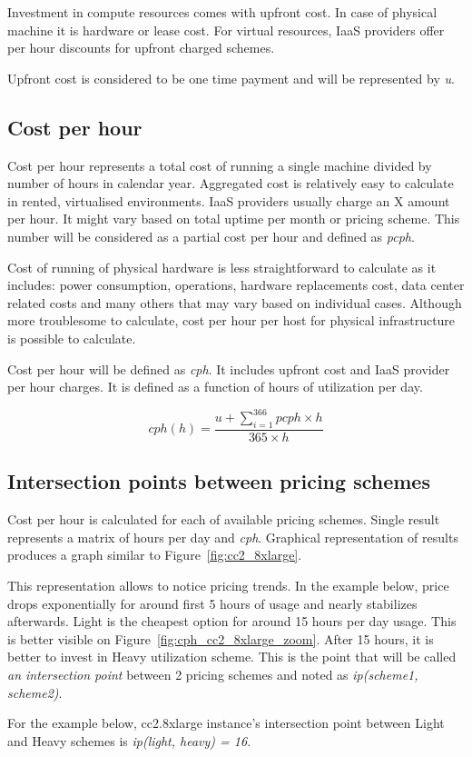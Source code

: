 \documentclass[]{final_report}
\begin{document}
Investment in compute resources comes with upfront cost. In case of physical machine it is hardware or lease cost. For virtual resources, IaaS providers offer per hour discounts for upfront charged schemes. \par
Upfront cost is considered to be one time payment and will be represented by \textit{u}. 

\subsection{Cost per hour}

Cost per hour represents a total cost of running a single machine divided by number of hours in calendar year. Aggregated cost is relatively easy to calculate in rented, virtualised environments. IaaS providers usually charge an X amount per hour. It might vary based on total uptime per month or pricing scheme. This number will be considered as a partial cost per hour and defined as \textit{pcph}. \par
Cost of running of physical hardware is less straightforward to calculate as it includes: power consumption, operations, hardware replacements cost, data center related costs and many others that may vary based on individual cases. Although more troublesome to calculate, cost per hour per host for physical infrastructure is possible to calculate. \par
Cost per hour will be defined as \textit{cph}. It includes upfront cost and IaaS provider per hour charges. It is defined as a function of hours of utilization per day.  

\begin{equation}
\label{eq:cph}
cph(h) = \frac{u + \sum_{i=1}^{366} pcph \times h}{365 \times h}
\end{equation}

\subsection{Intersection points between pricing schemes}

Cost per hour is calculated for each of available pricing schemes. Single result represents a matrix of hours per day and \textit{cph}. Graphical representation of results produces a graph similar to Figure~\ref{fig:cc2_8xlarge}. \par 
This representation allows to notice pricing trends. In the example below, price drops exponentially for around first 5 hours of usage and nearly stabilizes afterwards. Light is the cheapest option for around 15 hours per day usage. This is better visible on Figure~\ref{fig:cph_cc2_8xlarge_zoom}. After 15 hours, it is better to invest in Heavy utilization scheme. This is the point that will be called \textit{an intersection point} between 2 pricing schemes and noted as \textit{ip(scheme1, scheme2)}. \par
For the example below, cc2.8xlarge instance's intersection point between Light and Heavy schemes is \textit{ip(light, heavy) = 16}.
\end{document}
